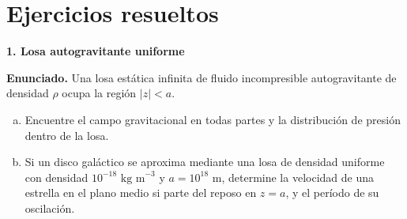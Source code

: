 \figuraGravitacionContinua

\section{Ejercicios resueltos}

\medskip
{\large\bfseries 1. Losa autogravitante uniforme\par}
\smallskip

\textbf{Enunciado.} Una losa estática infinita de fluido incompresible autogravitante de densidad $\rho$ ocupa la región $|z| < a$.
\begin{enumerate}[a)]
    \item Encuentre el campo gravitacional en todas partes y la distribución de presión dentro de la losa.
    \item Si un disco galáctico se aproxima mediante una losa de densidad uniforme con densidad $10^{-18} \text{ kg m}^{-3}$ y $a = 10^{18} \text{ m}$, determine la velocidad de una estrella en el plano medio si parte del reposo en $z = a$, y el período de su oscilación.
\end{enumerate}

